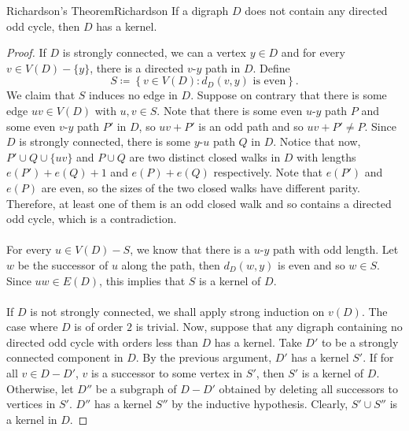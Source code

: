 \documentclass[math]{amznotes}
\theoremstyle{remark}
\newcommand{\0}{\mathbf{0}}
\newcommand{\1}{\mathbf{1}}
\begin{document}
\begin{thmbox}{Richardson's Theorem}{Richardson}
    If a digraph $D$ does not contain any directed odd cycle, then $D$ has a kernel.
    \tcblower
    \begin{proof}
        If $D$ is strongly connected, we can a vertex $y \in D$ and for every $v \in V(D) - \{y\}$, there is a directed $v$-$y$ path in $D$. Define 
        \begin{equation*}
            S \coloneqq \left\{v \in V(D) \colon d_{D}(v, y) \textrm{ is even}\right\}.
        \end{equation*}
        We claim that $S$ induces no edge in $D$. Suppose on contrary that there is some edge $uv \in V(D)$ with $u, v \in S$. Note that there is some even $u$-$y$ path $P$ and some even $v$-$y$ path $P'$ in $D$, so $uv + P'$ is an odd path and so $uv + P' \neq P$. Since $D$ is strongly connected, there is some $y$-$u$ path $Q$ in $D$. Notice that now, $P' \cup Q \cup \{uv\}$ and $P \cup Q$ are two distinct closed walks in $D$ with lengths $e(P') + e(Q) + 1$ and $e(P) + e(Q)$ respectively. Note that $e(P')$ and $e(P)$ are even, so the sizes of the two closed walks have different parity. Therefore, at least one of them is an odd closed walk and so contains a directed odd cycle, which is a contradiction.
        \\\\
        For every $u \in V(D) - S$, we know that there is a $u$-$y$ path with odd length. Let $w$ be the successor of $u$ along the path, then $d_D(w, y)$ is even and so $w \in S$. Since $uw \in E(D)$, this implies that $S$ is a kernel of $D$.
        \\\\
        If $D$ is not strongly connected, we shall apply strong induction on $v(D)$. The case where $D$ is of order $2$ is trivial. Now, suppose that any digraph containing no directed odd cycle with orders less than $D$ has a kernel. Take $D'$ to be a strongly connected component in $D$. By the previous argument, $D'$ has a kernel $S'$. If for all $v \in D - D'$, $v$ is a successor to some vertex in $S'$, then $S'$ is a kernel of $D$. Otherwise, let $D''$ be a subgraph of $D - D'$ obtained by deleting all successors to vertices in $S'$. $D''$ has a kernel $S''$ by the inductive hypothesis. Clearly, $S' \cup S''$ is a kernel in $D$.
    \end{proof}
\end{thmbox}
\end{document}
